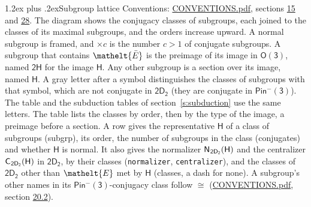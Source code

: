 \documentclass[10pt,a4paper]{article}
\makeatletter
\renewcommand\section{\@startsection{section}{1}{\z@}{-3ex plus -1ex minus -.2ex}%
  {1.2ex plus .2ex}{\normalfont\large\sffamily\bfseries\color{parttitle}}}
\numberwithin{equation}{section}
\newcommand{\eltfont}[1]{{\let\sigma\eltsigma\mathelt{#1}}}
\newcommand{\grp}[1]{\mathsf{#1}}
\newcommand{\cls}[1]{\eltfont{#1}}
\newcommand{\elt}[1]{\eltfont{#1}}
\newcommand{\samecls}{\cong}
\newcommand{\clsletter}[1]{\,{\scriptsize\color{black!55}#1}}
\newcommand{\barred}[1]{\bar{#1}}
\newcommand{\hairsp}{\mkern1mu}
\makeatother
\begin{document}
\section{Subgroup lattice}\label{s:subgroups}
Conventions: \href{../../CONVENTIONS.pdf}{CONVENTIONS.pdf}, sections \href{../../../rotation/CONVENTIONS.pdf\#conv.15}{15} and \href{../../CONVENTIONS.pdf\#conv.28}{28}.
The diagram shows the conjugacy classes of subgroups, each joined to the classes of its maximal subgroups, and the orders increase upward. \label{n:index.conjugates.c}A normal subgroup is framed, and ${\times}c$ is the number $c > 1$ of conjugate subgroups. \label{n:group.H}A subgroup that contains $\elt{\barred{E}}$ is the preimage of its image in $\grp{O(3)}$, named $\grp{2H}$ for the image $\grp{H}$. Any other subgroup is a section over its image, named $\grp{H}$. \label{n:mark.letter}A gray letter after a symbol distinguishes the classes of subgroups with that symbol, which are not conjugate in $\grp{2D_{2}}$ (they are conjugate in \href{Pinminus3.pdf}{$\grp{Pin^{-}(3)}$}). The table and the subduction tables of section~\ref{s:subduction} use the same letters. The table lists the classes by order, then by the type of the image, a preimage before a section. \label{n:head.subgroup}\label{n:head.order}\label{n:head.conjugates}\label{n:head.normal}A row gives the representative $\grp{H}$ of a class of subgroups (subgrp), its order, the number of subgroups in the class (conjugates) and whether $\grp{H}$ is normal. \label{n:group.normalizer}\label{n:group.centralizer}\label{n:head.classes}It also gives the normalizer $\grp{N}_{\hairsp \grp{2D_{2}}}(\grp{H})$ and the centralizer $\grp{C}_{\hairsp \grp{2D_{2}}}(\grp{H})$ in $\grp{2D_{2}}$, by their classes (\texttt{normalizer}, \texttt{centralizer}), and the classes of $\grp{2D_{2}}$ other than $\cls{E}$ met by $\grp{H}$ (classes, a dash for none). A subgroup's other names in its \href{Pinminus3.pdf}{$\grp{Pin^{-}(3)}$}-conjugacy class follow $\samecls$ (\href{../../CONVENTIONS.pdf}{CONVENTIONS.pdf}, section \href{../../CONVENTIONS.pdf\#conv.20.2}{20.2}).
\begin{center}
\end{center}
\end{document}
